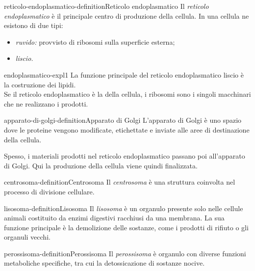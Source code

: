 \documentclass[preview]{standalone}
\begin{document}
\begin{snippetdefinition}{reticolo-endoplasmatico-definition}{Reticolo endoplasmatico}
    Il \textit{reticolo endoplasmatico} è il principale centro di produzione
    della cellula.
    In una cellula ne esistono di due tipi:
    \begin{itemize}
        \item \textit{ruvido:} provvisto di ribosomi sulla superficie esterna;
        \item \textit{liscio.}
    \end{itemize}
\end{snippetdefinition}

\begin{snippet}{endoplasmatico-expl1}
    La funzione principale del reticolo endoplasmatico liscio è
    la costruzione dei lipidi.\\
    Se il reticolo endoplasmatico è la  della cellula, i ribosomi sono i singoli macchinari che ne
    realizzano i prodotti.
\end{snippet}

\begin{snippetdefinition}{apparato-di-golgi-definition}{Apparato di Golgi}
    L'apparato di Golgi è uno spazio dove le proteine
    vengono modificate, etichettate e inviate alle aree di destinazione della cellula.
\end{snippetdefinition}

\begin{plainhtml}
    Spesso, i materiali prodotti nel reticolo endoplasmatico passano poi all'apparato di Golgi.
    Qui la produzione della cellula viene quindi finalizzata.
\end{plainhtml}

\begin{snippetdefinition}{centrosoma-definition}{Centrosoma}
    Il \textit{centrosoma} è una struttura coinvolta nel processo di divisione cellulare.
\end{snippetdefinition}

\begin{snippetdefinition}{lisosoma-definition}{Lisosoma}
    Il \textit{lisosoma} è un organulo presente solo nelle cellule animali costituito da enzimi digestivi
    racchiusi da una membrana.
    La sua funzione principale è la demolizione delle sostanze,
    come i prodotti di rifiuto o gli organuli vecchi.
\end{snippetdefinition}

\begin{snippetdefinition}{perossisoma-definition}{Perossisoma}
    Il \textit{perossisoma} è organulo con diverse funzioni metaboliche specifiche, tra cui la detossicazione di
    sostanze nocive.
\end{snippetdefinition}
\end{document}
